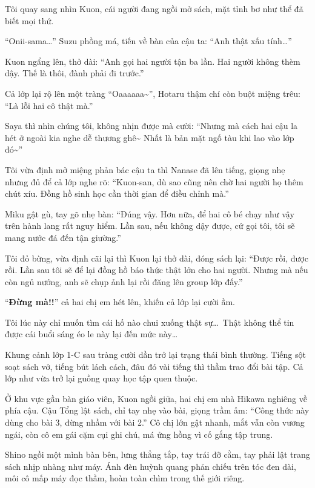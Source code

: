 \documentclass[../main.tex]{subfiles}
\begin{document}
Tôi quay sang nhìn Kuon, cái người đang ngồi mở sách, mặt tỉnh bơ như thể đã biết mọi thứ.

``Onii-sama\dots'' Suzu phồng má, tiến về bàn của cậu ta: ``Anh thật xấu tính\dots''

Kuon ngẩng lên, thở dài: ``Anh gọi hai người tận ba lần. Hai người không thèm dậy. Thế là thôi, đành phải đi trước.''

Cả lớp lại rộ lên một tràng ``Oaaaaaa\~{}'', Hotaru thậm chí còn buột miệng trêu: ``Là lỗi hai cô thật mà.''

Saya thì nhìn chúng tôi, không nhịn được mà cười: ``Nhưng mà cách hai cậu la hét ở ngoài kia nghe dễ thương ghê\~{} Nhất là bản mặt ngố tàu khi lao vào lớp đó\~{}''

Tôi vừa định mở miệng phản bác cậu ta thì Nanase đã lên tiếng, giọng nhẹ nhưng đủ để cả lớp nghe rõ: ``Kuon-san, dù sao cũng nên chờ hai người họ thêm chút xíu. Đồng hồ sinh học cần thời gian để điều chỉnh mà.''

Miku gật gù, tay gõ nhẹ bàn: ``Đúng vậy. Hơn nữa, để hai cô bé chạy như vậy trên hành lang rất nguy hiểm. Lần sau, nếu không dậy được, cứ gọi tôi, tôi sẽ mang nước đá đến tận giường.''

Tôi đỏ bừng, vừa định cãi lại thì Kuon lại thở dài, đóng sách lại: ``Được rồi, được rồi. Lần sau tôi sẽ để lại đồng hồ báo thức thật lớn cho hai người. Nhưng mà nếu còn ngủ nướng, anh sẽ chụp ảnh lại rồi đăng lên group lớp đấy.''

``\textbf{Đừng mà!!}'' cả hai chị em hét lên, khiến cả lớp lại cười ầm.

Tôi lúc này chỉ muốn tìm cái hố nào chui xuống thật sự\dots\ Thật không thể tin được cái buổi sáng éo le này lại đến mức này\dots

\pov{-}

Khung cảnh lớp 1-C sau tràng cười dần trở lại trạng thái bình thường. Tiếng sột soạt sách vở, tiếng bút lách cách, đâu đó vài tiếng thì thầm trao đổi bài tập. Cả lớp như vừa trở lại guồng quay học tập quen thuộc.

Ở khu vực gần bàn giáo viên, Kuon ngồi giữa, hai chị em nhà Hikawa nghiêng về phía cậu. Cậu Tổng lật sách, chỉ tay nhẹ vào bài, giọng trầm ấm: ``Công thức này dùng cho bài 3, đừng nhầm với bài 2.'' Cô chị lớn gật nhanh, mắt vẫn còn vương ngái, còn cô em gái cặm cụi ghi chú, má ửng hồng vì cố gắng tập trung.

Shino ngồi một mình bàn bên, lưng thẳng tắp, tay trái đỡ cằm, tay phải lật trang sách nhịp nhàng như máy. Ánh đèn huỳnh quang phản chiếu trên tóc đen dài, môi cô mấp máy đọc thầm, hoàn toàn chìm trong thế giới riêng.
\end{document}
